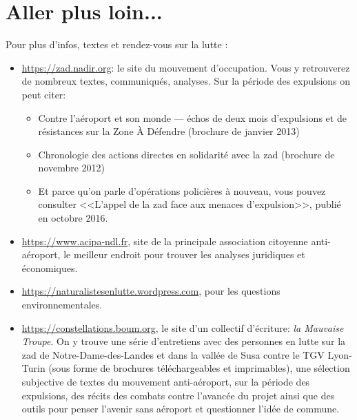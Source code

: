\chapter[Aller plus loin]{Aller plus loin...}


Pour plus d'infos, textes et rendez-vous sur la lutte :

\begin{itemize}[leftmargin=*]
\item \url{https://zad.nadir.org}: le site du mouvement d'occupation. Vous y retrouverez de nombreux textes, communiqués, analyses. Sur la période des expulsions on peut citer:
\begin{itemize}[label=$\cdot$] 
\item Contre l’aéroport et son monde — échos de deux mois d’expulsions et de résistances sur la Zone À Défendre (brochure de janvier 2013)
\item Chronologie des actions directes en solidarité avec la zad (brochure de novembre 2012)
\item Et parce qu'on parle d'opérations policières à nouveau, vous pouvez consulter <<L'appel de la zad face aux menaces d'expulsion>>, publié en octobre 2016.
\end{itemize}
\item \url{https://www.acipa-ndl.fr}, site de la principale association citoyenne anti-aéroport, le meilleur endroit pour trouver les analyses juridiques et économiques.  
\item \url{https://naturalistesenlutte.wordpress.com}, pour les questions environnementales.
\item \url{https://constellations.boum.org}, le site d'un collectif d'écriture: \textit{la Mauvaise Troupe}. On y trouve une série d'entretiens avec des personnes en lutte sur la zad de Notre-Dame-des-Landes et dans la vallée de Susa contre le TGV Lyon-Turin (sous forme de brochures téléchargeables et imprimables), une sélection subjective de textes du mouvement anti-aéroport, sur la période des expulsions, des récits des combats contre l'avancée du projet ainsi que des outils pour penser l'avenir sans aéroport et questionner l'idée de commune.


\end{itemize}
